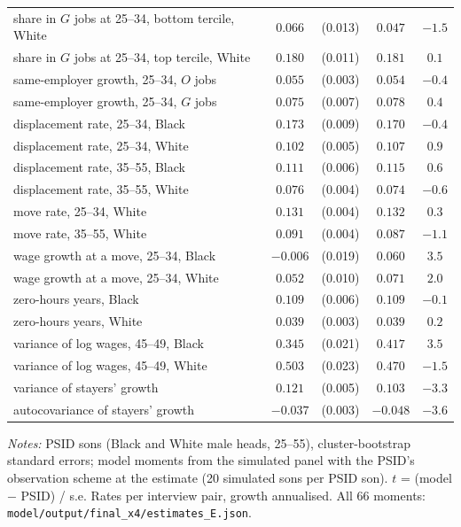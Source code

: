 \begin{table}[!htbp]
{\begin{tabular}{lcccc}
\quad share in $G$ jobs at 25--34, bottom tercile, White & $0.066$ & (0.013) & $0.047$ & $-1.5$ \\
\quad share in $G$ jobs at 25--34, top tercile, White & $0.180$ & (0.011) & $0.181$ & $0.1$ \\
\quad same-employer growth, 25--34, $O$ jobs & $0.055$ & (0.003) & $0.054$ & $-0.4$ \\
\quad same-employer growth, 25--34, $G$ jobs & $0.075$ & (0.007) & $0.078$ & $0.4$ \\
\quad displacement rate, 25--34, Black & $0.173$ & (0.009) & $0.170$ & $-0.4$ \\
\quad displacement rate, 25--34, White & $0.102$ & (0.005) & $0.107$ & $0.9$ \\
\quad displacement rate, 35--55, Black & $0.111$ & (0.006) & $0.115$ & $0.6$ \\
\quad displacement rate, 35--55, White & $0.076$ & (0.004) & $0.074$ & $-0.6$ \\
\quad move rate, 25--34, White & $0.131$ & (0.004) & $0.132$ & $0.3$ \\
\quad move rate, 35--55, White & $0.091$ & (0.004) & $0.087$ & $-1.1$ \\
\quad wage growth at a move, 25--34, Black & $-0.006$ & (0.019) & $0.060$ & $3.5$ \\
\quad wage growth at a move, 25--34, White & $0.052$ & (0.010) & $0.071$ & $2.0$ \\
\quad zero-hours years, Black & $0.109$ & (0.006) & $0.109$ & $-0.1$ \\
\quad zero-hours years, White & $0.039$ & (0.003) & $0.039$ & $0.2$ \\
\quad variance of log wages, 45--49, Black & $0.345$ & (0.021) & $0.417$ & $3.5$ \\
\quad variance of log wages, 45--49, White & $0.503$ & (0.023) & $0.470$ & $-1.5$ \\
\quad variance of stayers' growth & $0.121$ & (0.005) & $0.103$ & $-3.3$ \\
\quad autocovariance of stayers' growth & $-0.037$ & (0.003) & $-0.048$ & $-3.6$ \\
\bottomrule
\end{tabular}}
\par\smallskip
\begin{minipage}{\textwidth}\footnotesize \textit{Notes:} PSID sons (Black and White male heads, 25--55), cluster-bootstrap standard errors; model moments from the simulated panel with the PSID's observation scheme at the estimate (20 simulated sons per PSID son). $t$ = (model $-$ PSID) / s.e. Rates per interview pair, growth annualised. All 66 moments: \texttt{model/output/final\_x4/estimates\_E.json}.\end{minipage}
\end{table}
